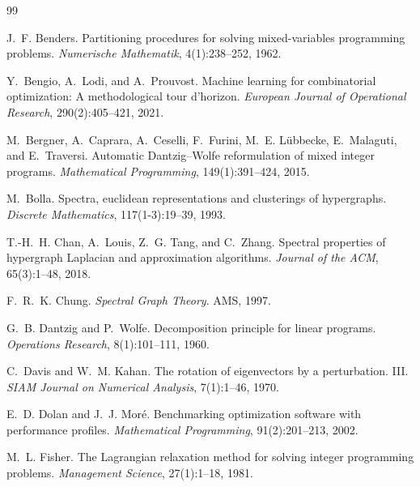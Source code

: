 \documentclass[12pt]{article}
\begin{document}
\begin{thebibliography}{99}

J.~F. Benders.
\newblock Partitioning procedures for solving mixed-variables programming
  problems.
\newblock \emph{Numerische Mathematik}, 4(1):238--252, 1962.

Y.~Bengio, A.~Lodi, and A.~Prouvost.
\newblock Machine learning for combinatorial optimization: A methodological
  tour d'horizon.
\newblock \emph{European Journal of Operational Research}, 290(2):405--421, 2021.

M.~Bergner, A.~Caprara, A.~Ceselli, F.~Furini, M.~E. L\"ubbecke,
  E.~Malaguti, and E.~Traversi.
\newblock Automatic {Dantzig--Wolfe} reformulation of mixed integer programs.
\newblock \emph{Mathematical Programming}, 149(1):391--424, 2015.

M.~Bolla.
\newblock Spectra, euclidean representations and clusterings of hypergraphs.
\newblock \emph{Discrete Mathematics}, 117(1-3):19--39, 1993.

T.-H.~H. Chan, A.~Louis, Z.~G. Tang, and C.~Zhang.
\newblock Spectral properties of hypergraph {Laplacian} and approximation
  algorithms.
\newblock \emph{Journal of the ACM}, 65(3):1--48, 2018.

F.~R.~K. Chung.
\newblock \emph{Spectral Graph Theory}.
\newblock AMS, 1997.

G.~B. Dantzig and P.~Wolfe.
\newblock Decomposition principle for linear programs.
\newblock \emph{Operations Research}, 8(1):101--111, 1960.

C.~Davis and W.~M. Kahan.
\newblock The rotation of eigenvectors by a perturbation. {III}.
\newblock \emph{SIAM Journal on Numerical Analysis}, 7(1):1--46, 1970.

E.~D. Dolan and J.~J. Mor\'e.
\newblock Benchmarking optimization software with performance profiles.
\newblock \emph{Mathematical Programming}, 91(2):201--213, 2002.

M.~L. Fisher.
\newblock The {Lagrangian} relaxation method for solving integer programming
  problems.
\newblock \emph{Management Science}, 27(1):1--18, 1981.


\end{thebibliography}
\end{document}
